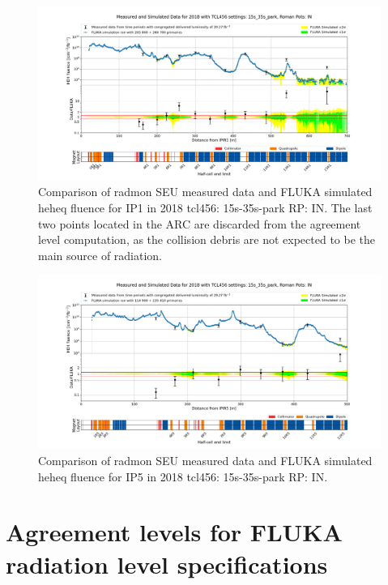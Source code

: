 \documentclass[encoding=utf8,british]{tumphthesis}
\begin{document}
\begin{figure}[H]
    \centering
    \includegraphics[width=0.90\linewidth]{results/IR1_2018_floor_level_0_700.png}
    \caption{Comparison of \acrshort{radmon} SEU measured data and FLUKA simulated \acrshort{heheq} fluence for IP1 in 2018 \acrshort{tcl}456: 15s-35s-park RP: IN. The last two points located in the ARC are discarded from the agreement level computation, as the collision debris are not expected to be the main source of radiation.}
    \label{fig:benchmark-radmon-heheq-ip1-2018}
\end{figure}



\begin{figure}[H]
    \centering
    \includegraphics[width=0.90\linewidth]{results/IR5_2018_floor_level_0_500.png}
    \caption{Comparison of \acrshort{radmon} SEU measured data and FLUKA simulated \acrshort{heheq} fluence for IP5 in 2018 \acrshort{tcl}456: 15s-35s-park RP: IN.}
    \label{fig:benchmark-radmon-heheq-ip5-2018}
\end{figure}

\newpage




\section{Agreement levels for FLUKA radiation level specifications}
\end{document}
